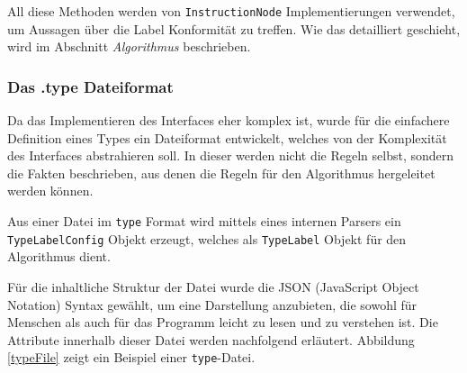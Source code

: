 All diese Methoden werden von \texttt{InstructionNode} Implementierungen 
verwendet, um Aussagen über die Label Konformität zu treffen. Wie das detailliert geschieht, 
wird im Abschnitt \textit{Algorithmus} beschrieben.

\subsubsection{Das .type Dateiformat}

Da das Implementieren des Interfaces eher komplex ist, wurde für die einfachere 
Definition eines Types ein Dateiformat entwickelt, welches von der Komplexität des
Interfaces abstrahieren soll. In dieser werden nicht die Regeln selbst, sondern 
die Fakten beschrieben, aus denen die Regeln für den Algorithmus hergeleitet werden 
können.

Aus einer Datei im \texttt{type} Format wird mittels eines internen Parsers ein
\texttt{TypeLabelConfig} Objekt erzeugt, welches als \texttt{TypeLabel} Objekt für
den Algorithmus dient.

Für die inhaltliche Struktur der Datei wurde die JSON (JavaScript Object Notation) Syntax 
gewählt, um eine Darstellung anzubieten, die sowohl für Menschen als auch für das 
Programm leicht zu lesen und zu verstehen ist. Die Attribute innerhalb dieser Datei 
werden nachfolgend erläutert. Abbildung \ref{typeFile} zeigt ein Beispiel einer \texttt{type}-Datei. 

